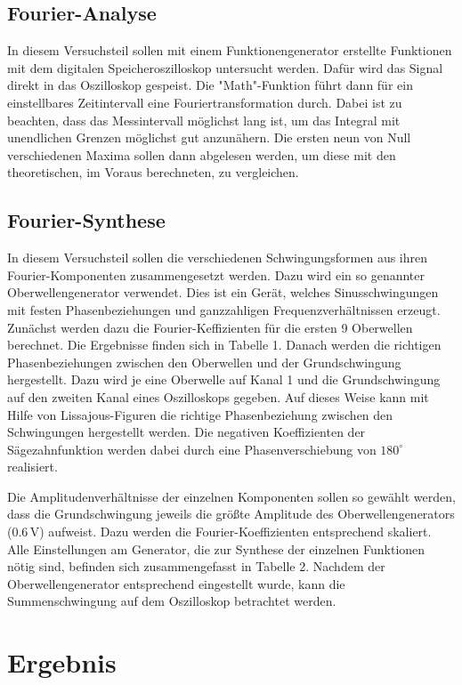 \documentclass[11pt,ngerman,a4paper]{article}
\begin{document}
\subsection{Fourier-Analyse}

In diesem Versuchsteil sollen mit einem Funktionengenerator erstellte Funktionen mit dem digitalen Speicheroszilloskop untersucht werden. Dafür wird das Signal direkt in das Oszilloskop gespeist. Die "Math"-Funktion führt dann für ein einstellbares Zeitintervall eine Fouriertransformation durch. Dabei ist zu beachten, dass das Messintervall möglichst lang ist, um das Integral mit unendlichen Grenzen möglichst gut anzunähern. Die ersten neun von Null verschiedenen Maxima sollen dann abgelesen werden, um diese mit den theoretischen, im Voraus berechneten, zu vergleichen.

\subsection{Fourier-Synthese}

In diesem Versuchsteil sollen die verschiedenen Schwingungsformen aus ihren Fourier-Komponenten zusammengesetzt werden. Dazu wird ein so genannter Oberwellengenerator verwendet. Dies ist ein Ger\"at, welches Sinusschwingungen mit festen Phasenbeziehungen und ganzzahligen Frequenzverh\"altnissen erzeugt. Zun\"achst werden dazu die Fourier-Keffizienten f\"ur die ersten 9 Oberwellen berechnet. Die Ergebnisse finden sich in Tabelle 1. Danach werden die richtigen Phasenbeziehungen zwischen den Oberwellen und der Grundschwingung hergestellt. Dazu wird je eine Oberwelle auf Kanal 1 und die Grundschwingung auf den zweiten Kanal eines Oszilloskops gegeben. Auf dieses Weise kann mit Hilfe von Lissajous-Figuren die richtige Phasenbeziehung zwischen den Schwingungen hergestellt werden. Die negativen Koeffizienten der S\"agezahnfunktion werden dabei durch eine Phasenverschiebung von $180 ^\circ$ realisiert. 

\noindent
Die Amplitudenverh\"altnisse der einzelnen Komponenten sollen so gew\"ahlt werden, dass die Grundschwingung jeweils die gr\"o\ss te Amplitude des Oberwellengenerators ($0.6\,$V) aufweist. Dazu werden die Fourier-Koeffizienten entsprechend skaliert. Alle Einstellungen am Generator, die zur Synthese der einzelnen Funktionen n\"otig sind, befinden sich zusammengefasst in Tabelle 2. Nachdem der Oberwellengenerator entsprechend eingestellt wurde, kann die Summenschwingung auf dem Oszilloskop betrachtet werden.
\section{Ergebnis}
\end{document}
